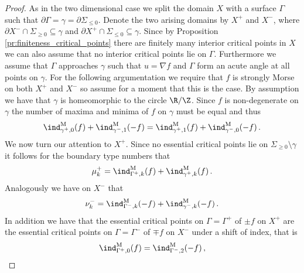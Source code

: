 \begin{proof}
  As in the two dimensional case we split the domain $X$ with a surface $\Gamma$ such that
  $\partial\Gamma=\gamma=\partial\Sigma_{\leq0}$.
  Denote the two arising domains by $X^+$ and $X^-$, where $\partial X^-\cap\Sigma_{\geq0}\subseteq\gamma$ and
  $\partial X^+\cap \Sigma_{\leq0}\subseteq\gamma$.
  Since by Proposition \ref{pr:finiteness_critical_points} there are finitely many interior critical points in $X$
  we can also assume that no interior critical points lie on $\Gamma$.
  Furthermore we assume that $\Gamma$ approaches $\gamma$ such that $u=\nabla f$ and $\Gamma$ form an acute angle at all points on $\gamma$.
  For the following argumentation we require that $f$ is strongly Morse on both $X^+$ and
  $X^-$ so assume for a moment that this is the case.
  By assumption we have that $\gamma$ is homeomorphic to the circle $\R/\Z$.
  Since $f$ is non-degenerate on $\gamma$
  the number of maxima and minima of $f$ on $\gamma$ must be equal and thus
  \begin{align}
    \ind^\text{M}_{\gamma^+,0}(f)+\ind^\text{M}_{\gamma^-,1}(-f)=\ind^\text{M}_{\gamma^+,1}(f)+\ind^\text{M}_{\gamma^-,0}(-f)\,.
    \label{eq:n3_disproof_morse_maxMinRel}
  \end{align}
  We now turn our attention to $X^+$. Since no essential critical points lie on $\Sigma_{\geq0}\setminus\gamma$ 
  it follows for the boundary type numbers that
  \begin{align}
    \mu^+_k=\ind^\text{M}_{\Gamma^+, k}(f)+\ind^\text{M}_{\gamma^+,k}(f)\,.\label{eq:n3_disproof_morse_muplus}
  \end{align}
  Analogously we have on $X^-$ that
  \begin{align}
    \nu^-_k=\ind^\text{M}_{\Gamma^-,k}(-f)+\ind^\text{M}_{\gamma^-,k}(-f)\,.\label{eq:n3_disproof_morse_numinus}
  \end{align}
  In addition we have that the essential critical points on $\Gamma=\Gamma^+$ of $\pm f$ on $X^+$ are the
  essential critical points on $\Gamma=\Gamma^-$ of $\mp f$ on $X^-$ under a shift of index, that is
  \begin{equation}
    \begin{aligned}
      \ind^\text{M}_{\Gamma^+,0}(f)&=\ind^\text{M}_{\Gamma^-,2}(-f)\,, \\

\end{aligned}
\end{equation}
\end{proof}
